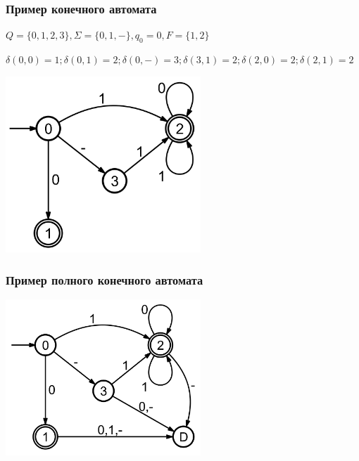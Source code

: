 \documentclass{beamer}
\begin{document}
\begin{frame}[fragile]
  \transwipe[direction=90]
  \frametitle{Пример конечного автомата}

 $Q = \{ 0, 1, 2, 3\}, \Sigma = \{ 0, 1, -\}, q_0 = 0, F = \{1, 2\}$
 
 $\delta (0, 0) = 1; \delta (0, 1) = 2; \delta (0, -) = 3; \delta (3, 1) = 2; \delta (2, 0) = 2; \delta (2, 1) = 2 $ 

  \begin{center}
     \includegraphics[width=0.55\textwidth]{pics/automaton.png}  
   \end{center}
\end{frame}

\begin{frame}[fragile]
  \transwipe[direction=90]
  \frametitle{Пример полного конечного автомата}
  \begin{center}
     \includegraphics[width=0.55\textwidth]{pics/FA_DN.PNG}  
   \end{center}
\end{frame}
\end{document}
